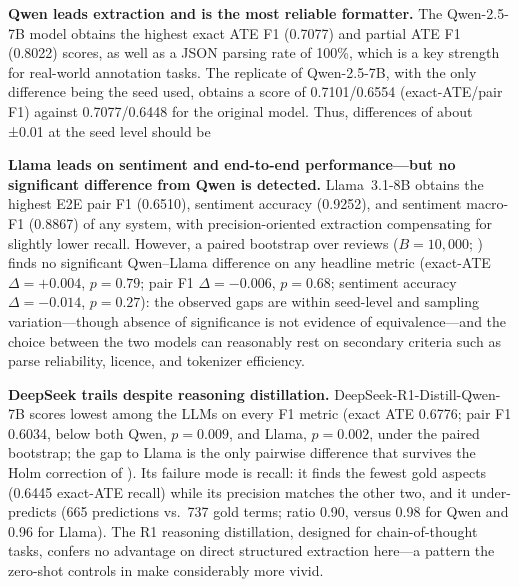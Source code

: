 \documentclass[bdcc,article,submit,moreauthors]{Definitions/mdpi}
\begin{document}
\textbf{Qwen leads extraction and is the most reliable formatter.} The Qwen-2.5-7B model obtains the highest exact ATE F1 (0.7077) and partial ATE F1 (0.8022) scores, as well as a JSON parsing rate of 100\%, which is a key strength for real-world annotation tasks. The replicate of Qwen-2.5-7B, with the only difference being the seed used, obtains a score of 0.7101/0.6554 (exact-ATE/pair F1) against 0.7077/0.6448 for the original model. Thus, differences of about ±0.01 at the seed level should be

\textbf{Llama leads on sentiment and end-to-end performance---but no significant difference from Qwen is detected.} Llama~3.1-8B obtains the highest E2E pair F1 (0.6510), sentiment accuracy (0.9252), and sentiment macro-F1 (0.8867) of any system, with precision-oriented extraction compensating for slightly lower recall. However, a paired bootstrap over reviews ($B{=}10{,}000$; ) finds no significant Qwen--Llama difference on any headline metric (exact-ATE $\Delta{=}{+}0.004$, $p{=}0.79$; pair F1 $\Delta{=}{-}0.006$, $p{=}0.68$; sentiment accuracy $\Delta{=}{-}0.014$, $p{=}0.27$): the observed gaps are within seed-level and sampling variation---though absence of significance is not evidence of equivalence---and the choice between the two models can reasonably rest on secondary criteria such as parse reliability, licence, and tokenizer efficiency.

\textbf{DeepSeek trails despite reasoning distillation.} DeepSeek-R1-Distill-Qwen-7B scores lowest among the LLMs on every F1 metric (exact ATE 0.6776; pair F1 0.6034, below both Qwen, $p{=}0.009$, and Llama, $p{=}0.002$, under the paired bootstrap; the gap to Llama is the only pairwise difference that survives the Holm correction of ). Its failure mode is recall: it finds the fewest gold aspects (0.6445 exact-ATE recall) while its precision matches the other two, and it under-predicts (665 predictions vs.\ 737 gold terms; ratio 0.90, versus 0.98 for Qwen and 0.96 for Llama). The R1 reasoning distillation, designed for chain-of-thought tasks, confers no advantage on direct structured extraction here---a pattern the zero-shot controls in  make considerably more vivid.
\end{document}
